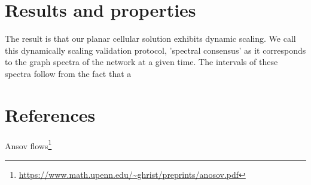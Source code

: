 \documentclass{article}
\begin{document}
\section{Results and properties}
The result is that our planar cellular solution exhibits dynamic scaling. We call this dynamically scaling validation protocol, 'spectral consensus' as it corresponds to the graph spectra of the network at a given time. The intervals of these spectra follow from the fact that a 

\section{References}
Ansov flows\footnote{\url{https://www.math.upenn.edu/~ghrist/preprints/anosov.pdf}}


\end{document}
